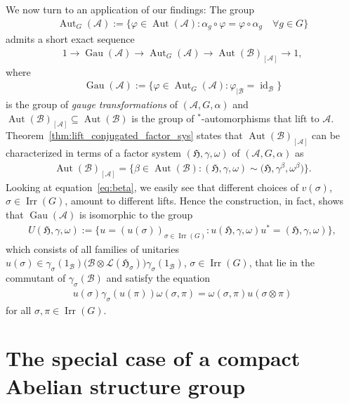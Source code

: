 \documentclass[pdftex]{sigma}
\numberwithin{equation}{section}
\newcommand*{\tensor}{\otimes}		%
\DeclareMathOperator{\id}{id}		%
\DeclareMathOperator{\Aut}{Aut}
\DeclareMathOperator{\Gau}{Gau}
\newcommand*{\Star}{$^*$\nobreakdash}
\newcommand*{\hilb}{\mathfrak}		%
\newcommand*{\alg}{\mathcal}		%
\newcommand*{\hH}{\hilb{H}}			%
\newcommand*{\one}{1}				%
\newcommand*{\aA}{\alg{A}}			%
\newcommand*{\aB}{\alg{B}} 			%
\newcommand*{\End}{\mathcal{L}} %
\DeclareMathOperator{\Irrep}{Irr} 			%
\begin{document}
We now turn to an application of our findings:
The group
\begin{gather*}
	\Aut_G(\aA) := \bigl\{ \varphi \in \Aut(\aA)\colon \alpha_g \circ \varphi = \varphi\circ \alpha_g \quad \forall g \in G \bigr\}
\end{gather*}
admits a short exact sequence
\begin{gather}\label{eq:AtiyahNCgroup}
	1 \longrightarrow \Gau(\aA) \longrightarrow \Aut_G(\aA)\longrightarrow \Aut(\aB)_{[\aA]} \longrightarrow 1,
\end{gather}
where
\begin{gather*}
	\Gau(\aA) := \bigl\{\varphi \in \Aut_G(\aA)\colon \varphi_{\mid \aB} = \id_\aB \bigr\}
\end{gather*}
is the group of \emph{gauge transformations} of $(\aA, G, \alpha)$ and $\Aut(\aB)_{[\aA]} \subseteq \Aut(\aB)$ is the group of \Star-automorphisms that lift to $\aA$.
Theorem~\ref{thm:lift_conjugated_factor_sys} states that $\Aut(\aB)_{[\aA]}$ can be characterized in terms of a factor system $(\hH, \gamma, \omega)$ of $(\aA, G, \alpha)$ as
\begin{gather*}
	\Aut(\aB)_{[\aA]} = \bigl\{ \beta \in \Aut(\aB)\colon (\hH,\gamma, \omega) \sim \big(\hH, \gamma^\beta, \omega^\beta\big) \bigr\}.
\end{gather*}
Looking at equation~\eqref{eq:beta}, we easily see that different choices of $v(\sigma)$, $\sigma \in \Irrep(G)$, amount to different lifts.
Hence the construction, in fact, shows that $\Gau(\aA)$ is isomorphic to the group
\begin{gather*}
	U(\hH, \gamma, \omega) := \bigl\{ u = (u(\sigma))_{\sigma \in \Irrep(G)}\colon u(\hH, \gamma, \omega)u^* = (\hH, \gamma, \omega) \bigr\},
\end{gather*}
which consists of all families of unitaries $u(\sigma) \in \gamma_\sigma(\one_\aB) \big( \aB \tensor \End(\hH_\sigma) \big) \gamma_\sigma(\one_\aB)$, $\sigma \in \Irrep(G)$, that lie in the commutant of $\gamma_\sigma(\aB)$ and satisfy the equation
\begin{gather*}
	u(\sigma) \gamma_\sigma ( u(\pi)) \omega(\sigma, \pi) = \omega(\sigma, \pi) u(\sigma \tensor \pi)
\end{gather*}
for all $\sigma, \pi \in \Irrep(G)$.

\section{The special case of a compact Abelian structure group}\label{sec:cpt_abelian}
\end{document}
